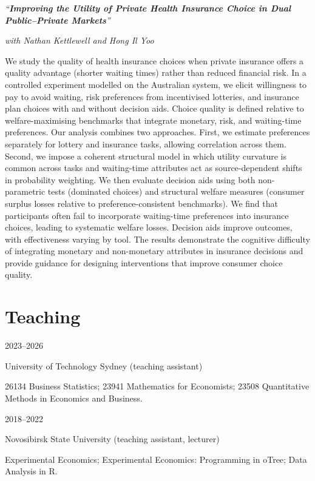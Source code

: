 \documentclass[11pt,a4paper]{article}
\newcommand{\entry}[2]{%
  \begin{minipage}[t]{0.15\textwidth}\raggedright\small #1\end{minipage}%
  \hfill%
  \begin{minipage}[t]{0.83\textwidth}#2\end{minipage}%
  \par\vspace{5pt}}
\newcommand{\nodate}[1]{#1\par\vspace{7pt}}
\newcommand{\paper}[3]{%
  \emph{``#1''}\par\vspace{1pt}
  \ifx\relax#2\relax\else{\small #2}\par\vspace{1pt}\fi
  {\small #3}\par}
\begin{document}
\nodate{\paper
  {\textbf{Improving the Utility of Private Health Insurance Choice in Dual Public--Private Markets}}
  {\textit{with Nathan Kettlewell and Hong Il Yoo}}
{\relax}
     {We study the quality of health insurance choices when private insurance offers a quality advantage (shorter waiting times) rather than reduced financial risk. In a controlled experiment modelled on the Australian system, we elicit willingness to pay to avoid waiting, risk preferences from incentivised lotteries, and insurance plan choices with and without decision aids. Choice quality is defined relative to welfare-maximising benchmarks that integrate monetary, risk, and waiting-time preferences. Our analysis combines two approaches. First, we estimate preferences separately for lottery and insurance tasks, allowing correlation across them. Second, we impose a coherent structural model in which utility curvature is common across tasks and waiting-time attributes act as source-dependent shifts in probability weighting. We then evaluate decision aids using both non-parametric tests (dominated choices) and structural welfare measures (consumer surplus losses relative to preference-consistent benchmarks). We find that participants often fail to incorporate waiting-time preferences into insurance choices, leading to systematic welfare losses. Decision aids improve outcomes, with effectiveness varying by tool. The results demonstrate the cognitive difficulty of integrating monetary and non-monetary attributes in insurance decisions and provide guidance for designing interventions that improve consumer choice quality.}}
     
\section{Teaching}

\entry{2023--2026}{University of Technology Sydney (teaching assistant)\par
  {\small 26134 Business Statistics; 23941 Mathematics for Economists;
   23508 Quantitative Methods in Economics and Business.}}

\entry{2018--2022}{Novosibirsk State University (teaching assistant, lecturer)\par
  {\small Experimental Economics;
   Experimental Economics: Programming in oTree;
   Data Analysis in R.}}



\end{document}
